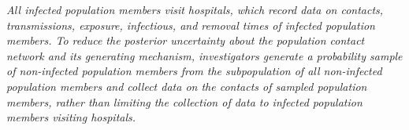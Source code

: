 {\em All infected population members visit hospitals,
which record data on contacts, transmissions, exposure, infectious, and removal times of infected population members.
To reduce the posterior uncertainty about the population contact network and its generating mechanism,
investigators generate a probability sample of non-infected population members from the subpopulation of all non-infected population members and collect data on the contacts of sampled population members,
rather than limiting the collection of data to infected population members visiting hospitals.}
